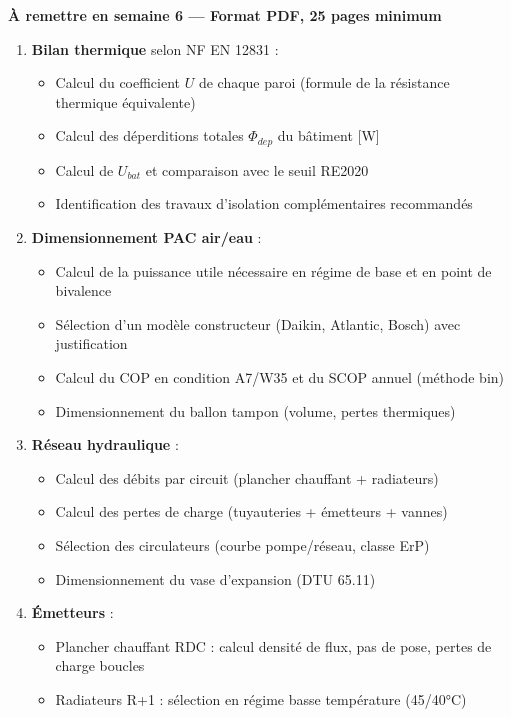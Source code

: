 \begin{methode}
\textbf{À remettre en semaine 6 — Format PDF, 25 pages minimum}

\begin{enumerate}
  \item \textbf{Bilan thermique} selon NF EN 12831 :
    \begin{itemize}
      \item Calcul du coefficient $U$ de chaque paroi (formule de la résistance thermique équivalente)
      \item Calcul des déperditions totales $\Phi_{dep}$ du bâtiment [\si{\watt}]
      \item Calcul de $U_{bat}$ et comparaison avec le seuil RE2020
      \item Identification des travaux d'isolation complémentaires recommandés
    \end{itemize}

  \item \textbf{Dimensionnement PAC air/eau} :
    \begin{itemize}
      \item Calcul de la puissance utile nécessaire en régime de base et en point de bivalence
      \item Sélection d'un modèle constructeur (Daikin, Atlantic, Bosch) avec justification
      \item Calcul du COP en condition A7/W35 et du SCOP annuel (méthode bin)
      \item Dimensionnement du ballon tampon (volume, pertes thermiques)
    \end{itemize}

  \item \textbf{Réseau hydraulique} :
    \begin{itemize}
      \item Calcul des débits par circuit (plancher chauffant + radiateurs)
      \item Calcul des pertes de charge (tuyauteries + émetteurs + vannes)
      \item Sélection des circulateurs (courbe pompe/réseau, classe ErP)
      \item Dimensionnement du vase d'expansion (DTU 65.11)
    \end{itemize}

  \item \textbf{Émetteurs} :
    \begin{itemize}
      \item Plancher chauffant RDC : calcul densité de flux, pas de pose, pertes de charge boucles
      \item Radiateurs R+1 : sélection en régime basse température (45/40°C)
    \end{itemize}


\end{enumerate}
\end{methode}
